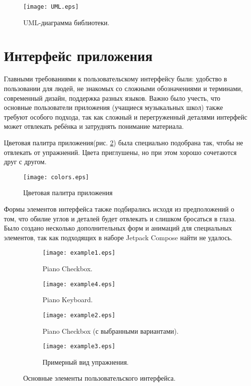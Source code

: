 \begin{figure}[H]
  \centering
  \texttt{[image: UML.eps]}
  \caption{UML-диаграмма библиотеки.}
  \label{fig:boat1}
\end{figure}

\section{Интерфейс приложения}
Главными требованиями к пользовательскому интерфейсу были: удобство в пользовании для людей, не знакомых со сложными обозначениями и терминами, современный дизайн, поддержка разных языков. Важно было учесть, что основные пользователи приложения (учащиеся музыкальных школ) также требуют особого подхода, так как сложный и перегруженный деталями интерфейс может отвлекать ребёнка и затруднять понимание материала.\par 
Цветовая палитра приложения(рис. \ref{fig:colors}) была специально подобрана так, чтобы не отвлекать от упражнений. Цвета приглушены, но при этом хорошо сочетаются друг с другом.\par

\begin{figure}[H]
  \centering
  \texttt{[image: colors.eps]}
  \caption{Цветовая палитра приложения}
  \label{fig:colors}
\end{figure}

Формы элементов интерфейса также подбирались исходя из предположений о том, что обилие углов и деталей будет отвлекать и слишком бросаться в глаза. Было создано несколько дополнительных форм и анимаций для специальных элементов, так как подходящих в наборе Jetpack Compose найти не удалось.\par

\begin{figure}[H]
  \centering
  \begin{subfigure}[b]{0.35\linewidth}
    \texttt{[image: example1.eps]}
    \caption{Piano Checkbox.}
  \end{subfigure}
  \begin{subfigure}[b]{0.4\linewidth}
    \texttt{[image: example4.eps]}
    \caption{Piano Keyboard.}
  \end{subfigure}
  \begin{subfigure}[b]{0.4\linewidth}
    \texttt{[image: example2.eps]}
    \caption{Piano Checkbox (с выбранными вариантами).}
  \end{subfigure}
    \begin{subfigure}[b]{0.3\linewidth}
    \texttt{[image: example3.eps]}
    \caption{Примерный вид упражнения.}
  \end{subfigure}
  \caption{Основные элементы пользовательского интерфейса.}
  \label{fig:app}
\end{figure}